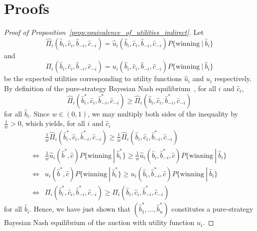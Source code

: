 \section{Proofs}
\label{sec:proofs_indirect}
\begin{proof}[Proof of Proposition~\ref{prop:equivalence_of_utilities_indirect}]
Let
\begin{equation*}
  \displaystyle\hat\Pi_i(\hat{b}_i,\hat{c}_i,\hat{b}_{-i},\hat{c}_{-i}) = \hat{u}_i(\hat{b}_i, \hat{c}_i, \hat{b}_{-i}, \hat{c}_{-i})P\{\textrm{winning}\:|\:\hat{b}_i\}
\end{equation*}
and
\begin{equation*}
  \displaystyle\Pi_i(\hat{b}_i,\hat{c}_i,\hat{b}_{-i},\hat{c}_{-i}) = u_i(\hat{b}_i, \hat{c}_i, \hat{b}_{-i}, \hat{c}_{-i})P\{\textrm{winning}\:|\:\hat{b}_i\}
\end{equation*}
be the expected utilities corresponding to utility functions $\hat{u}_i$ and $u_i$ respectively. By definition of the pure-strategy Bayesian Nash equilibrium~\cite{Gibbons92}, for all $i$ and $\hat{c}_i$,
\begin{equation*}
  \hat\Pi_i(\hat{b}_i^*,\hat{c}_i,\hat{b}_{-i}^*,\hat{c}_{-i})\geq \hat\Pi_i(\hat{b}_i,\hat{c}_i,\hat{b}_{-i}^*,\hat{c}_{-i})
\end{equation*}
for all $\hat{b}_i$. Since $w\in(0,1)$, we may multiply both sides of the inequality by $\frac{1}{w} > 0$, which yields, for all $i$ and $\hat{c}_i$
\begin{align*}
  &\frac{1}{w}\hat\Pi_i(\hat{b}_i^*,\hat{c}_i,\hat{b}_{-i}^*,\hat{c}_{-i})\geq \frac{1}{w}\hat\Pi_i(\hat{b}_i,\hat{c}_i,\hat{b}_{-i}^*,\hat{c}_{-i}) \\
  \iff &\frac{1}{w}\hat{u}_i(\hat{b}^*, \hat{c})P\{\textrm{winning}\:|\:\hat{b}_i^*\}\geq \frac{1}{w}\hat{u}_i(\hat{b}_i, \hat{b}_{-i}^*, \hat{c})P\{\textrm{winning}\:|\:\hat{b}_i\} \\
  \iff &u_i(\hat{b}^*, \hat{c})P\{\textrm{winning}\:|\:\hat{b}_i^*\}\geq u_i(\hat{b}_i, \hat{b}_{-i}^*, \hat{c})P\{\textrm{winning}\:|\:\hat{b}_i\} \\
  \iff &\Pi_i(\hat{b}_i^*,\hat{c}_i,\hat{b}_{-i}^*,\hat{c}_{-i})\geq \Pi_i(\hat{b}_i,\hat{c}_i,\hat{b}_{-i}^*,\hat{c}_{-i})
\end{align*}
for all $\hat{b}_i$. Hence, we have just shown that $(\hat{b}_1^*,\ldots,\hat{b}_n^*)$ constitutes a pure-strategy Bayesian Nash equilibrium of the auction with utility function $u_i$.
\end{proof}
